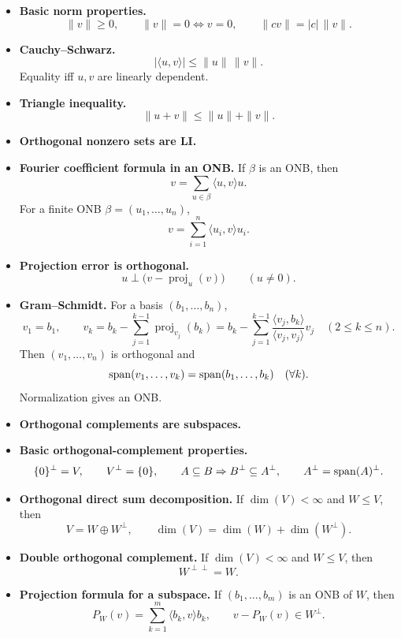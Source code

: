 \begin{itemize}[leftmargin=*]
\item \textbf{Basic norm properties.}
\[
\|v\|\ge 0,
\qquad
\|v\|=0\iff v=0,
\qquad
\|cv\|=|c|\,\|v\|.
\]

\item \textbf{Cauchy--Schwarz.}
\[
|\langle u,v\rangle|\le \|u\|\,\|v\|.
\]
Equality iff $u,v$ are linearly dependent.

\item \textbf{Triangle inequality.}
\[
\|u+v\|\le \|u\|+\|v\|.
\]

\item \textbf{Orthogonal nonzero sets are LI.}

\item \textbf{Fourier coefficient formula in an ONB.} If $\beta$ is an ONB, then
\[
v=\sum_{u\in\beta}\langle u,v\rangle u.
\]
For a finite ONB $\beta=(u_1,\dots,u_n)$,
\[
v=\sum_{i=1}^n\langle u_i,v\rangle u_i.
\]

\item \textbf{Projection error is orthogonal.}
\[
u\perp \bigl(v-\operatorname{proj}_u(v)\bigr)
\qquad(u\neq 0).
\]

\item \textbf{Gram--Schmidt.} For a basis $(b_1,\dots,b_n)$,
\[
v_1=b_1,
\qquad
v_k=b_k-\sum_{j=1}^{k-1}\operatorname{proj}_{v_j}(b_k)
=b_k-\sum_{j=1}^{k-1}\frac{\langle v_j,b_k\rangle}{\langle v_j,v_j\rangle}v_j
\quad(2\le k\le n).
\]
Then $(v_1,\dots,v_n)$ is orthogonal and
\[
\operatorname{span}(v_1,\dots,v_k)=\operatorname{span}(b_1,\dots,b_k)\quad(\forall k).
\]
Normalization gives an ONB.

\item \textbf{Orthogonal complements are subspaces.}

\item \textbf{Basic orthogonal-complement properties.}
\[
\{0\}^\perp=V,
\qquad
V^\perp=\{0\},
\qquad
A\subseteq B\Rightarrow B^\perp\subseteq A^\perp,
\qquad
A^\perp=\operatorname{span}(A)^\perp.
\]

\item \textbf{Orthogonal direct sum decomposition.} If $\dim(V)<\infty$ and $W\le V$, then
\[
V=W\oplus W^\perp,
\qquad
\dim(V)=\dim(W)+\dim(W^\perp).
\]

\item \textbf{Double orthogonal complement.} If $\dim(V)<\infty$ and $W\le V$, then
\[
W^{\perp\perp}=W.
\]

\item \textbf{Projection formula for a subspace.} If $(b_1,\dots,b_m)$ is an ONB of $W$, then
\[
P_W(v)=\sum_{k=1}^m\langle b_k,v\rangle b_k,
\qquad
v-P_W(v)\in W^\perp.
\]
\end{itemize}

